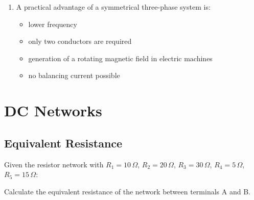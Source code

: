 \documentclass[a4paper,12pt]{article}
\newif\ifshowsolutions
\begin{document}
\begin{enumerate}[label=\textbf{\arabic*.}, leftmargin=*, itemsep=8pt]
\ifshowsolutions
Solution: A
\fi

  \item A practical advantage of a symmetrical three-phase system is:
    \begin{itemize}[label=$\square$]
      \item[A)] lower frequency
      \item[B)] only two conductors are required
      \item[C)] generation of a rotating magnetic field in electric machines
      \item[D)] no balancing current possible
    \end{itemize}

\ifshowsolutions
Solution: C
\fi

\end{enumerate}

\newpage

\section{DC Networks}

\subsection{Equivalent Resistance}

Given the resistor network with $R_1 = 10\,\Omega$, $R_2 = 20\,\Omega$, $R_3 = 30\,\Omega$, $R_4 = 5\,\Omega$, $R_5 = 15\,\Omega$:

\begin{center}
\end{center}

Calculate the equivalent resistance of the network between terminals A and B.

\ifshowsolutions
Solution:
\[
R_{23} = R_2 + R_3 = 20 + 30 = 50\,\Omega
\]
\[
\frac{1}{R_{234}} = \frac{1}{R_{23}} + \frac{1}{R_4} = \frac{1}{50} + \frac{1}{5} = \frac{11}{50}\,\frac{1}{\Omega}
\]
\[
R = R_1 + R_{234} + R_5 = 10 + \frac{50}{11} + 15 = 29.55\,\Omega
\]
\fi
\end{document}
